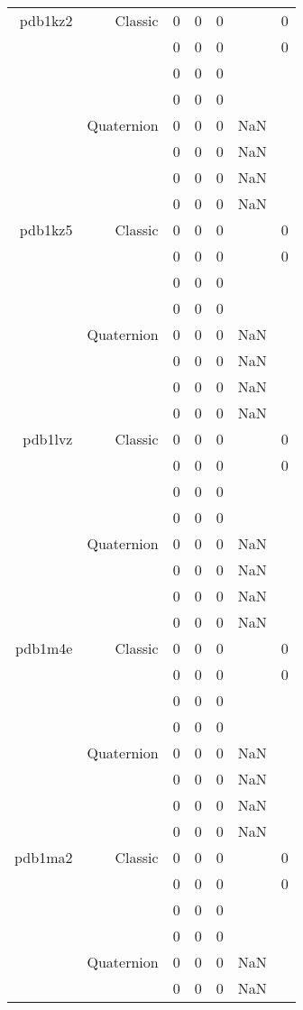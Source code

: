 \begin{xltabular}{\textwidth}{r|rcccSc}
pdb1kz2 & Classic & 0 & 0 & 0 & & 0 \\
& & 0 & 0 & 0 & & 0 \\
& & 0 & 0 & 0 & & \\
& & 0 & 0 & 0 & & \\
& Quaternion & 0 & 0 & 0 & NaN & \\
& & 0 & 0 & 0 & NaN & \\
& & 0 & 0 & 0 & NaN & \\
& & 0 & 0 & 0 & NaN & \\ \addlinespace
pdb1kz5 & Classic & 0 & 0 & 0 & & 0 \\
& & 0 & 0 & 0 & & 0 \\
& & 0 & 0 & 0 & & \\
& & 0 & 0 & 0 & & \\
& Quaternion & 0 & 0 & 0 & NaN & \\
& & 0 & 0 & 0 & NaN & \\
& & 0 & 0 & 0 & NaN & \\
& & 0 & 0 & 0 & NaN & \\ \addlinespace
pdb1lvz & Classic & 0 & 0 & 0 & & 0 \\
& & 0 & 0 & 0 & & 0 \\
& & 0 & 0 & 0 & & \\
& & 0 & 0 & 0 & & \\
& Quaternion & 0 & 0 & 0 & NaN & \\
& & 0 & 0 & 0 & NaN & \\
& & 0 & 0 & 0 & NaN & \\
& & 0 & 0 & 0 & NaN & \\ \addlinespace
pdb1m4e & Classic & 0 & 0 & 0 & & 0 \\
& & 0 & 0 & 0 & & 0 \\
& & 0 & 0 & 0 & & \\
& & 0 & 0 & 0 & & \\
& Quaternion & 0 & 0 & 0 & NaN & \\
& & 0 & 0 & 0 & NaN & \\
& & 0 & 0 & 0 & NaN & \\
& & 0 & 0 & 0 & NaN & \\ \addlinespace
pdb1ma2 & Classic & 0 & 0 & 0 & & 0 \\
& & 0 & 0 & 0 & & 0 \\
& & 0 & 0 & 0 & & \\
& & 0 & 0 & 0 & & \\
& Quaternion & 0 & 0 & 0 & NaN & \\
& & 0 & 0 & 0 & NaN & \\

\end{xltabular}
